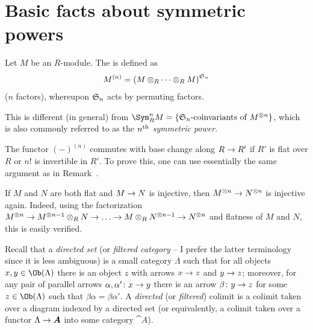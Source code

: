 \documentclass[a4paper,parskip=half,numbers=enddot, DIV=12]{scrreprt}
\begin{document}
\section{Basic facts about symmetric powers}
\begin{defi}
	Let $M$ be an $R$-module. The  is defined as
	\begin{align*}
		M^{(n)}=\left(M\otimes_R\cdots\otimes_RM\right)^{\mathfrak{S}_n}
	\end{align*}
	($n$ factors), whereupon $\mathfrak{S}_n$ acts by permuting factors.
\end{defi}
\begin{rem}
	\begin{alphanumerate}
		\item This is different (in general) from $\Sym_R^nM=\left\{\SS_n\text{-coinvariants of }M^{\otimes n}\right\}$, which is also commonly referred to as the \emph{$n^{\text{th}}$ symmetric power}.
		\item The functor $(-)^{(n)}$ commutes with base change along $R\morphism R'$ if $R'$ is flat over $R$ or $n!$ is invertible in $R'$. To prove this, one can use essentially the same argument as in Remark~.
		\item If $M$ and $N$ are both flat and $M\morphism N$ is injective, then $M^{\otimes n}\morphism N^{\otimes n}$ is injective again. Indeed, using the factorization $M^{\otimes n}\morphism M^{\otimes n-1}\otimes_RN\morphism\ldots\morphism M\otimes_RN^{\otimes n-1}\morphism N^{\otimes n}$ and flatness of $M$ and $N$, this is easily verified. 
	\end{alphanumerate}
\end{rem}
Recall that a \emph{directed set} (or \emph{filtered category} -- I prefer the latter terminology since it is less ambiguous) is a small category $\Lambda$ such that for all objects $x,y\in\Ob(\Lambda)$ there is an object $z$ with arrows $x\morphism z$ and $y\morphism z$; moreover, for any pair of parallel arrows $\alpha,\alpha'\colon x\morphism y$ there is an arrow $\beta\colon y\morphism z$ for some $z\in\Ob(\Lambda)$ such that $\beta\alpha=\beta\alpha'$. A \emph{directed} (or \emph{filtered}) colimit is a colimit taken over a diagram indexed by a directed set (or equivalently, a colimit taken over a functor $\Lambda\morphism\cat A$ into some category $\cat A$).
\end{document}
